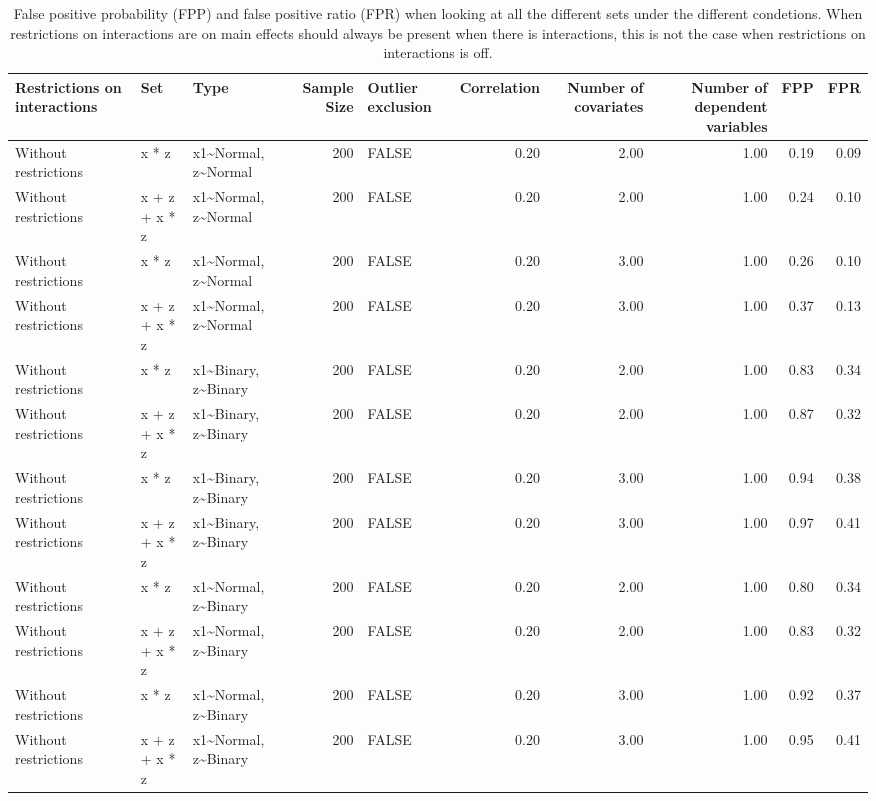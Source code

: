 \begin{longtable}{lllrlrrrrr}
\caption{False positive probability (FPP) and false positive ratio (FPR) when looking at all the different sets under the different condetions. When restrictions on interactions are on main effects should always be present when there is interactions, this is not the case when restrictions on interactions is off.} \\ 
  \hline
Restrictions on interactions & Set & Type & Sample Size & Outlier exclusion & Correlation & Number of covariates & Number of dependent variables & FPP & FPR \\ 
  \hline
Without restrictions & x * z & x1\~{}Normal, z\~{}Normal & 200 & FALSE & 0.20 & 2.00 & 1.00 & 0.19 & 0.09 \\ 
  Without restrictions & x + z + x * z & x1\~{}Normal, z\~{}Normal & 200 & FALSE & 0.20 & 2.00 & 1.00 & 0.24 & 0.10 \\ 
  Without restrictions & x * z & x1\~{}Normal, z\~{}Normal & 200 & FALSE & 0.20 & 3.00 & 1.00 & 0.26 & 0.10 \\ 
  Without restrictions & x + z + x * z & x1\~{}Normal, z\~{}Normal & 200 & FALSE & 0.20 & 3.00 & 1.00 & 0.37 & 0.13 \\ 
  Without restrictions & x * z & x1\~{}Binary, z\~{}Binary & 200 & FALSE & 0.20 & 2.00 & 1.00 & 0.83 & 0.34 \\ 
  Without restrictions & x + z + x * z & x1\~{}Binary, z\~{}Binary & 200 & FALSE & 0.20 & 2.00 & 1.00 & 0.87 & 0.32 \\ 
  Without restrictions & x * z & x1\~{}Binary, z\~{}Binary & 200 & FALSE & 0.20 & 3.00 & 1.00 & 0.94 & 0.38 \\ 
  Without restrictions & x + z + x * z & x1\~{}Binary, z\~{}Binary & 200 & FALSE & 0.20 & 3.00 & 1.00 & 0.97 & 0.41 \\ 
  Without restrictions & x * z & x1\~{}Normal, z\~{}Binary & 200 & FALSE & 0.20 & 2.00 & 1.00 & 0.80 & 0.34 \\ 
  Without restrictions & x + z + x * z & x1\~{}Normal, z\~{}Binary & 200 & FALSE & 0.20 & 2.00 & 1.00 & 0.83 & 0.32 \\ 
  Without restrictions & x * z & x1\~{}Normal, z\~{}Binary & 200 & FALSE & 0.20 & 3.00 & 1.00 & 0.92 & 0.37 \\ 
  Without restrictions & x + z + x * z & x1\~{}Normal, z\~{}Binary & 200 & FALSE & 0.20 & 3.00 & 1.00 & 0.95 & 0.41 \\ 

\end{longtable}

